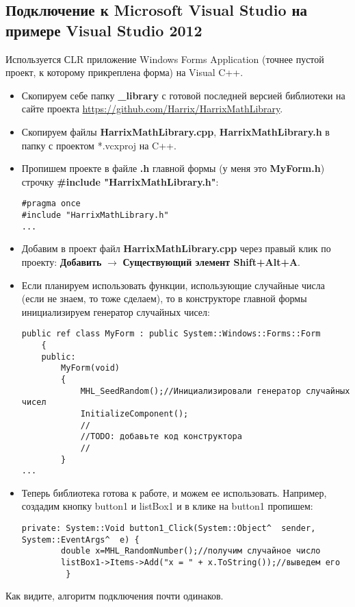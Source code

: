 \subsection{Подключение к Microsoft Visual Studio на примере Visual Studio 2012}

Используется СLR приложение Windows Forms Application (точнее пустой проект, к которому прикреплена форма) на Visual C++.

\begin{itemize}
\item Скопируем себе папку \textbf{\_library} с готовой последней версией библиотеки на сайте проекта \href{https://github.com/Harrix/HarrixMathLibrary}{https://github.com/Harrix/HarrixMathLibrary}.

\item Скопируем файлы \textbf{HarrixMathLibrary.cpp}, \textbf{HarrixMathLibrary.h} в папку с проектом *.vcxproj на C++.

\item Пропишем проекте в файле \textbf{.h} главной формы (у меня это \textbf{MyForm.h}) строчку \textbf{\#include "HarrixMathLibrary.h"}:
\begin{lstlisting}[label=install_code_07,caption=Подключение библиотеки]
#pragma once
#include "HarrixMathLibrary.h"
...
\end{lstlisting}

\item Добавим в проект файл \textbf{HarrixMathLibrary.cpp} через правый клик по проекту: \textbf{Добавить} $\rightarrow$ \textbf{Существующий элемент Shift+Alt+A}.

\item Если планируем использовать функции, использующие случайные числа (если не знаем, то тоже сделаем), то в конструкторе главной формы инициализируем генератор случайных чисел:
\begin{lstlisting}[label=install_code_08,caption=Инициализация генератора случайных чисел]
	public ref class MyForm : public System::Windows::Forms::Form
	{
	public:
		MyForm(void)
		{
			MHL_SeedRandom();//Инициализировали генератор случайных чисел
			InitializeComponent();
			//
			//TODO: добавьте код конструктора
			//
		}
...
\end{lstlisting}

\item Теперь библиотека готова к работе, и можем ее использовать. Например, создадим кнопку button1 и listBox1 и в клике на button1 пропишем:
\begin{lstlisting}[label=install_code_09,caption=Пример использования]
private: System::Void button1_Click(System::Object^  sender, System::EventArgs^  e) {
 		double x=MHL_RandomNumber();//получим случайное число
 		listBox1->Items->Add("x = " + x.ToString());//выведем его
 		 }
\end{lstlisting}
\end{itemize}

Как видите, алгоритм подключения почти одинаков.